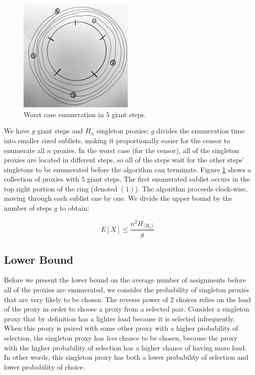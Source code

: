 \begin{figure}[h!]
\centering
     \includegraphics[width=0.5\textwidth]{fig/giant_step_upper_bound.png}
    \caption{Worst case enumeration in $5$ giant steps.}

    \label{fig:ubgs}
\end{figure}

We have $g$ giant steps and $H_n$ singleton proxies; $g$ divides the enumeration time into smaller sized sublists, making it proportionally easier for the censor to enumerate all $n$ proxies. In the worst case (for the censor), all of the singleton proxies are located in different steps, so all of the steps wait for the other steps' singletons to be enumerated before the algorithm can terminate. Figure \ref{fig:ubgs} shows a collection of proxies with $5$ giant steps. The first enumerated sublist occurs in the top right portion of the ring (denoted $(1)$). The algorithm proceeds clock-wise, moving through each sublist one by one. We divide the upper bound by the number of steps $g$ to obtain:

$$E[X] \leq \frac{ n^2H_{\lceil{H_n}\rceil}}{g}$$


\subsection{Lower Bound}
Before we present the lower bound on the average number of assignments before all of the proxies are enumerated, we consider the probability of singleton proxies that are very likely to be chosen. The reverse power of 2 choices relies on the load of the proxy in order to choose a proxy from a selected pair. Consider a singleton proxy that by definition has a lighter load because it is selected infrequently. When this proxy is paired with some other proxy with a higher probability of selection, the singleton proxy has \textit{less} chance to be chosen, because the proxy with the higher probability of selection has a higher chance of having more load. In other words, this singleton proxy has both a lower probability of selection and lower probability of choice. 

